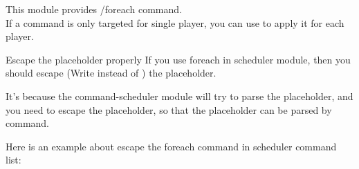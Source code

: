 
This module provides /foreach command.\\
If a command is only targeted for single player, you can use  to apply it for each player.


\begin{example}{}
\end{example}

\begin{tips}{Escape the placeholder properly}
    If you use foreach in scheduler module, then you should escape (Write  instead of ) the placeholder.

    It's because the command-scheduler module will try to parse the placeholder, and you need to escape the placeholder, so that the placeholder can be parsed by  command.

    Here is an example about escape the foreach command in scheduler command list: 
\end{tips}